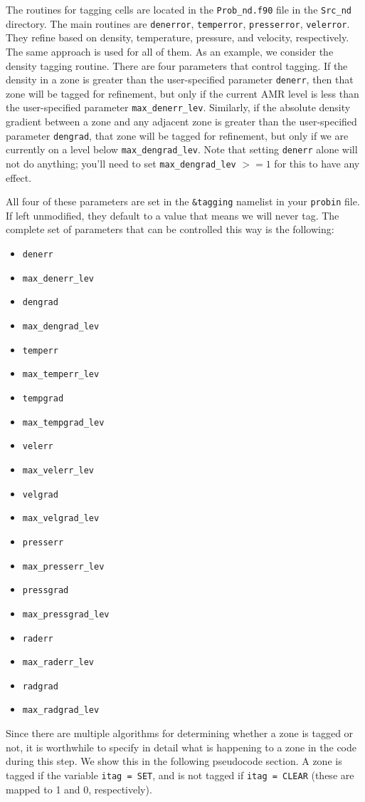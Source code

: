The routines for tagging cells are located in the {\tt Prob\_nd.f90} file 
in the {\tt Src\_nd} directory. The main routines are 
{\tt denerror}, {\tt temperror}, {\tt presserror}, {\tt velerror}. They refine
based on density, temperature, pressure, and velocity, respectively. The same approach is used 
for all of them. As an example, we consider the density tagging routine. There 
are four parameters that control tagging. If the density in a zone is greater than 
the user-specified parameter {\tt denerr}, then that zone will be tagged 
for refinement, but only if the current AMR level is less than the 
user-specified parameter {\tt max\_denerr\_lev}. Similarly, 
if the absolute density gradient between a zone and any adjacent zone 
is greater than the user-specified parameter {\tt dengrad}, that zone 
will be tagged for refinement, but only if we are currently on a level 
below {\tt max\_dengrad\_lev}. Note that setting {\tt denerr} alone will 
not do anything; you'll need to set {\tt max\_dengrad\_lev} $>= 1$ for
this to have any effect.

All four of these parameters are set in the {\tt \&tagging} namelist 
in your {\tt probin} file. If left unmodified, they default to a value 
that means we will never tag. The complete set of parameters that can 
be controlled this way is the following:
\begin{multicols}{5}
\begin{itemize}
  \setlength{\itemindent}{-3em}
  \item {\tt denerr}
  \item {\tt max\_denerr\_lev}
  \item {\tt dengrad}
  \item {\tt max\_dengrad\_lev}
  \item {\tt temperr}
  \item {\tt max\_temperr\_lev}
  \item {\tt tempgrad}
  \item {\tt max\_tempgrad\_lev}
  \item {\tt velerr}
  \item {\tt max\_velerr\_lev}
  \item {\tt velgrad}
  \item {\tt max\_velgrad\_lev}
  \item {\tt presserr}
  \item {\tt max\_presserr\_lev}
  \item {\tt pressgrad}
  \item {\tt max\_pressgrad\_lev}
  \item {\tt raderr}
  \item {\tt max\_raderr\_lev}
  \item {\tt radgrad}
  \item {\tt max\_radgrad\_lev}
\end{itemize}
\end{multicols}
Since there are multiple algorithms for determining 
whether a zone is tagged or not, it is worthwhile to specify 
in detail what is happening to a zone in the code during this step. 
We show this in the following pseudocode section. A zone 
is tagged if the variable {\tt itag = SET}, and is not tagged 
if {\tt itag = CLEAR} (these are mapped to 1 and 0, respectively).

